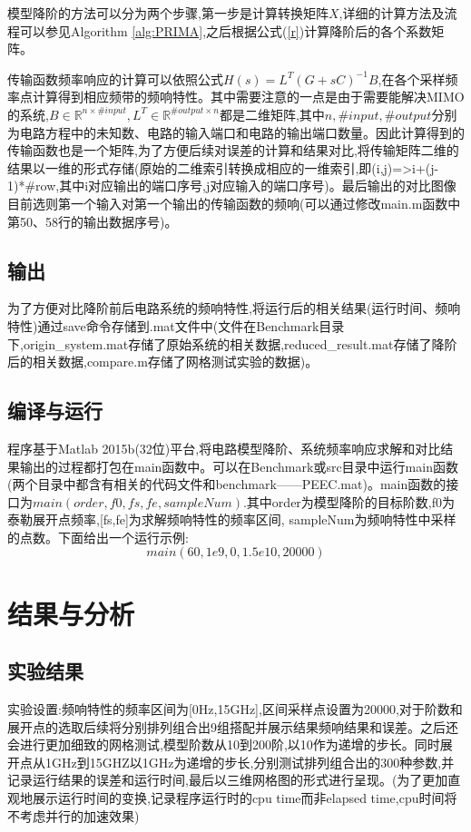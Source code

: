 \documentclass[12pt]{article}
\begin{document}
\begin{sloppypar}
\qquad 模型降阶的方法可以分为两个步骤,第一步是计算转换矩阵$X$,详细的计算方法及流程可以参见Algorithm \ref{alg:PRIMA},之后根据公式(\ref{r})计算降阶后的各个系数矩阵。

\qquad 传输函数频率响应的计算可以依照公式$H(s)=L^T(G+sC)^{-1}B$,在各个采样频率点计算得到相应频带的频响特性。其中需要注意的一点是由于需要能解决MIMO的系统,$B \in \mathbb{R}^{n \times \#input}, L^T \in \mathbb{R}^{\#output \times n}$都是二维矩阵,其中$n, \#input, \#output$分别为电路方程中的未知数、电路的输入端口和电路的输出端口数量。因此计算得到的传输函数也是一个矩阵,为了方便后续对误差的计算和结果对比,将传输矩阵二维的结果以一维的形式存储(原始的二维索引转换成相应的一维索引,即(i,j)=>i+(j-1)*#row,其中i对应输出的端口序号,j对应输入的端口序号)。最后输出的对比图像目前选则第一个输入对第一个输出的传输函数的频响(可以通过修改main.m函数中第50、58行的输出数据序号)。

\subsection{输出}
\qquad 为了方便对比降阶前后电路系统的频响特性,将运行后的相关结果(运行时间、频响特性)通过save命令存储到.mat文件中(文件在Benchmark目录下,origin\_system.mat存储了原始系统的相关数据,reduced\_result.mat存储了降阶后的相关数据,compare.m存储了网格测试实验的数据)。

\subsection{编译与运行}
\qquad 程序基于Matlab 2015b(32位)平台,将电路模型降阶、系统频率响应求解和对比结果输出的过程都打包在main函数中。可以在Benchmark或src目录中运行main函数(两个目录中都含有相关的代码文件和benchmark——PEEC.mat)。main函数的接口为$main(order, f0, fs, fe, sampleNum)$.其中order为模型降阶的目标阶数,f0为泰勒展开点频率,[fs,fe]为求解频响特性的频率区间, sampleNum为频响特性中采样的点数。下面给出一个运行示例:
\begin{equation}
  main(60, 1e9, 0, 1.5e10, 20000)
\end{equation}

\section{结果与分析}
\subsection{实验结果}
\qquad 实验设置:频响特性的频率区间为[0Hz,15GHz],区间采样点设置为20000,对于阶数和展开点的选取后续将分别排列组合出9组搭配并展示结果频响结果和误差。之后还会进行更加细致的网格测试,模型阶数从10到200阶,以10作为递增的步长。同时展开点从1GHz到15GHZ以1GHz为递增的步长,分别测试排列组合出的300种参数,并记录运行结果的误差和运行时间,最后以三维网格图的形式进行呈现。(为了更加直观地展示运行时间的变换,记录程序运行时的cpu time而非elapsed time,cpu时间将不考虑并行的加速效果)


\end{sloppypar}
\end{document}
